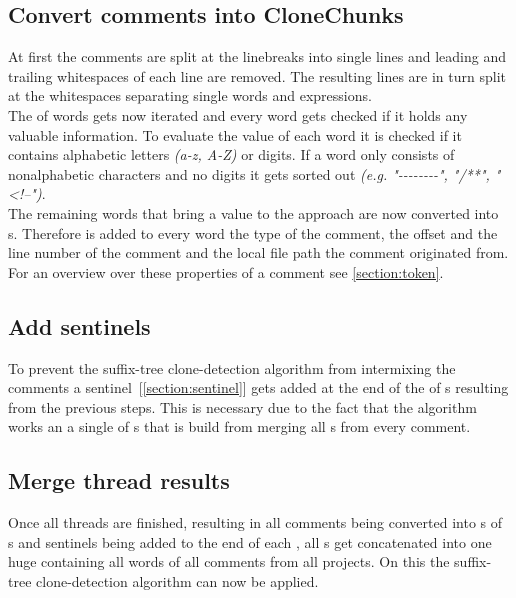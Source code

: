 \subsection{Convert comments into CloneChunks}
At first the comments are split at the linebreaks into single lines and leading and trailing whitespaces of each line are removed. The resulting lines are in turn split at the whitespaces separating single words and expressions.\\
The  of words gets now iterated and every word gets checked if it holds any valuable information. To evaluate the value of each word it is checked if it contains alphabetic letters \textit{(a-z, A-Z)} or digits. If a word only consists of nonalphabetic characters and no digits it gets sorted out \textit{(e.g. "-{}-{}-{}-{}-{}-{}-{}-", "/**", "<!--")}.\\
The remaining words that bring a value to the approach are now converted into s. Therefore is added to every word the type of the comment, the offset and the line number of the comment and the local file path the comment originated from.\\
For an overview over these properties of a comment see \ref{section:token}.

\subsection{Add sentinels}
To prevent the suffix-tree clone-detection algorithm from intermixing the comments a sentinel~[\ref{section:sentinel}] gets added at the end of the  of s resulting from the previous steps. This is necessary due to the fact that the algorithm works an a single  of s that is build from merging all s from every comment.

\subsection{Merge thread results}
Once all threads are finished, resulting in all comments being converted into s of s and sentinels being added to the end of each , all s get concatenated into one huge  containing all words of all comments from all projects. On this  the suffix-tree clone-detection algorithm can now be applied.

